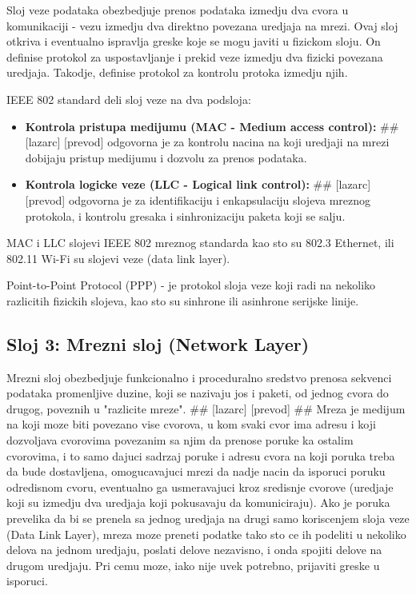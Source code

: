 \documentclass[a4paper,12pt, master]{etf}
\begin{document}
	Sloj veze podataka obezbedjuje prenos podataka izmedju dva cvora u komunikaciji - vezu 
	izmedju dva direktno povezana uredjaja na mrezi. Ovaj sloj otkriva i eventualno ispravlja 
	greske koje se mogu javiti u fizickom sloju. On definise protokol za uspostavljanje i 
	prekid veze izmedju dva fizicki povezana uredjaja. Takodje, definise protokol za kontrolu 
	protoka izmedju njih.

	IEEE 802 standard deli sloj veze na dva podsloja:
	\begin{itemize}
		\item \textbf{Kontrola pristupa medijumu (MAC - Medium access control):}
		\#\# [lazarc] [prevod]
		odgovorna je za kontrolu nacina na koji uredjaji na mrezi dobijaju pristup medijumu i
		dozvolu za prenos podataka.
		\item \textbf{Kontrola logicke veze (LLC - Logical link control):}
		\#\# [lazarc] [prevod]
		odgovorna je za identifikaciju i enkapsulaciju slojeva mreznog protokola, i kontrolu
		gresaka i sinhronizaciju paketa koji se salju.
	\end{itemize}

	MAC i LLC slojevi IEEE 802 mreznog standarda kao sto su 802.3 Ethernet, ili 802.11 Wi-Fi su
	slojevi veze (data link layer).

	Point-to-Point Protocol (PPP) - je protokol sloja veze koji radi na nekoliko razlicitih
	fizickih slojeva, kao sto su sinhrone ili asinhrone serijske linije.

	\subsection{Sloj 3: Mrezni sloj (Network Layer)}

	Mrezni sloj obezbedjuje funkcionalno i proceduralno sredstvo prenosa sekvenci podataka
	promenljive duzine, koji se nazivaju jos i paketi, od jednog cvora do drugog, poveznih u
	"razlicite mreze". \#\# [lazarc] [prevod] \#\# Mreza je medijum na koji moze biti povezano 
	vise cvorova, u kom svaki cvor ima adresu i koji dozvoljava cvorovima povezanim sa njim da 
	prenose poruke ka ostalim cvorovima, i to samo dajuci sadrzaj poruke i adresu cvora na 
	koji poruka treba da bude dostavljena, omogucavajuci mrezi da nadje nacin da isporuci 
	poruku odredisnom cvoru, eventualno ga usmeravajuci kroz sredisnje cvorove (uredjaje koji 
	su izmedju dva uredjaja koji pokusavaju da komuniciraju). Ako je poruka prevelika da bi se 
	prenela sa jednog uredjaja na drugi samo koriscenjem sloja veze (Data Link Layer), mreza 
	moze preneti podatke tako sto ce ih podeliti u nekoliko delova na jednom uredjaju, poslati 
	delove nezavisno, i onda spojiti delove na drugom uredjaju. Pri cemu moze, iako nije uvek 
	potrebno, prijaviti greske u isporuci.
\end{document}
